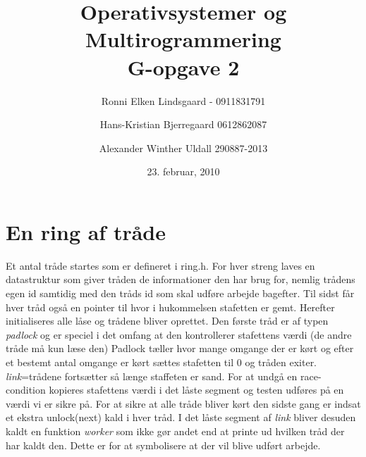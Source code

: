 \documentclass[titlepage]{article}
\title{Operativsystemer og Multirogrammering \\G-opgave 2}
\author{Ronni Elken Lindsgaard - 0911831791 \and
Hans-Kristian Bjerregaard 0612862087 \and
Alexander Winther Uldall 290887-2013}
\date{23. februar, 2010}
\begin{document}
\maketitle
\newpage
\section{En ring af tråde}
Et antal tråde startes som er defineret i ring.h. For hver streng laves en datastruktur som giver tråden de informationer den har brug for, nemlig trådens egen id samtidig med den tråds id som skal udføre arbejde bagefter. Til sidst får hver tråd også en pointer til hvor i hukommelsen stafetten er gemt.
Herefter initialiseres alle låse og trådene bliver oprettet. Den første tråd er af typen {\it padlock} og er speciel i det omfang at den kontrollerer stafettens værdi (de andre tråde må kun læse den)
Padlock tæller hvor mange omgange der er kørt og efter et bestemt antal omgange er kørt sættes stafetten til 0 og tråden exiter.
{\it link}=trådene fortsætter så længe staffeten er sand. For at undgå en race-condition kopieres stafettens værdi i det låste segment og testen udføres på en værdi vi er sikre på.
For at sikre at alle tråde bliver kørt den sidste gang er indsat et ekstra unlock(next) kald i hver tråd.
I det låste segment af {\it link} bliver desuden kaldt en funktion {\it worker} som ikke gør andet end at printe ud hvilken tråd der har kaldt den. Dette er for at symbolisere at der vil blive udført arbejde.
\end{document}
